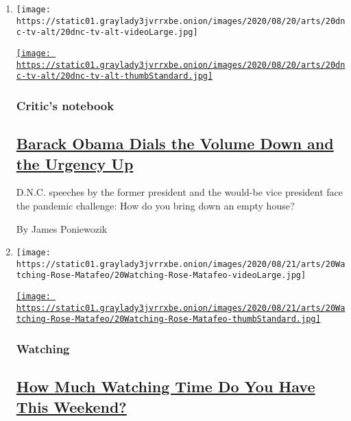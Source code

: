 \begin{enumerate}
\def\labelenumi{\arabic{enumi}.}
\item
  \texttt{[image: https://static01.graylady3jvrrxbe.onion/images/2020/08/20/arts/20dnc-tv-alt/20dnc-tv-alt-videoLarge.jpg]}

  \href{/2020/08/20/arts/television/dnc-barack-obama.html}{\texttt{[image: https://static01.graylady3jvrrxbe.onion/images/2020/08/20/arts/20dnc-tv-alt/20dnc-tv-alt-thumbStandard.jpg]}}

  \hypertarget{critics-notebook}{%
  \subsubsection{Critic's notebook}\label{critics-notebook}}

  \hypertarget{barack-obama-dials-the-volume-down-and-the-urgency-up}{%
  \subsection{\texorpdfstring{\href{/2020/08/20/arts/television/dnc-barack-obama.html}{Barack
  Obama Dials the Volume Down and the Urgency
  Up}}{Barack Obama Dials the Volume Down and the Urgency Up}}\label{barack-obama-dials-the-volume-down-and-the-urgency-up}}

  D.N.C. speeches by the former president and the would-be vice
  president face the pandemic challenge: How do you bring down an empty
  house?

  By James Poniewozik
\item
  \texttt{[image: https://static01.graylady3jvrrxbe.onion/images/2020/08/21/arts/20Watching-Rose-Matafeo/20Watching-Rose-Matafeo-videoLarge.jpg]}

  \href{/2020/08/20/arts/television/nxivm-hbo-love-time-corona.html}{\texttt{[image: https://static01.graylady3jvrrxbe.onion/images/2020/08/21/arts/20Watching-Rose-Matafeo/20Watching-Rose-Matafeo-thumbStandard.jpg]}}

  \hypertarget{watching}{%
  \subsubsection{Watching}\label{watching}}

  \hypertarget{how-much-watching-time-do-you-have-this-weekend}{%
  \subsection{\texorpdfstring{\href{/2020/08/20/arts/television/nxivm-hbo-love-time-corona.html}{How
  Much Watching Time Do You Have This
  Weekend?}}{How Much Watching Time Do You Have This Weekend?}}\label{how-much-watching-time-do-you-have-this-weekend}}


\end{enumerate}
